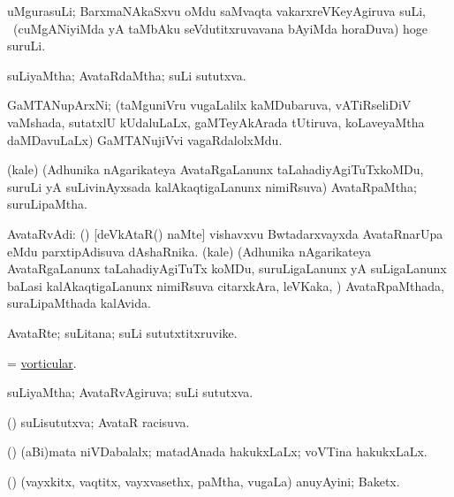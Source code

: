 \bentry
{} 
\gl{\nA}
\expl{}
\bmng
uMgurasuLi; BarxmaNAkaSxvu oMdu saMvaqta vakarxreVKeyAgiruva suLi, \udA\ (cuMgANiyiMda yA taMbAku seVdutitxruvavana bAyiMda horaDuva) hoge suruLi. 
\emng
\eentry

\bentry 
{} 
\gl{\gu}
\expl{}
\bmng
 suLiyaMtha; AvataRdaMtha; suLi sututxva. 
\emng
\eentry

\bentry 
{} 
\gl{\nA}
\expl{}
\bmng
 GaMTANupArxNi; (taMguniVru \mo vugaLalilx kaMDubaruva, vATiRseliDiV vaMshada, sutatxlU kUdaluLaLx, gaMTeyAkArada tUtiruva, koLaveyaMtha daMDavuLaLx) GaMTANujiVvi vagaRdalolxMdu. 
\emng
\eentry

\bentry
{} 
\gl{\nA}
\expl{}
\bmng
 (kale) (Adhunika nAgarikateya AvataRgaLanunx taLahadiyAgiTuTxkoMDu, suruLi yA suLivinAyxsada kalAkaqtigaLanunx nimiRsuva) AvataRpaMtha; suruLipaMtha. 
\emng
\eentry

\bentry 
{} 
\gl{\nA}
\expl{}
\bmng
 AvataRvAdi: 
\banum
{} (\tashA) [deVkAtaR() naMte] vishavxvu Bwtadarxvayxda AvataRnarUpa eMdu parxtipAdisuva dAshaRnika. 
 (kale) (Adhunika nAgarikateya AvataRgaLanunx taLahadiyAgiTuTx koMDu, suruLigaLanunx yA suLigaLanunx baLasi kalAkaqtigaLanunx nimiRsuva citarxkAra, leVKaka, \mo) AvataRpaMthada, suraLipaMthada kalAvida. 
\eanum
\emng
\eentry

\bentry 
{} 
\gl{\nA}
\expl{}
\bmng
 AvataRte; suLitana; suLi sututxtitxruvike. 
\emng
\eentry

\bentry 
{} 
\gl{\gu}
\expl{}
\bmng
 = \hyperlink{vorticular}{vorticular}. 
\emng
\eentry

\bentry 
{} 
\gl{\gu}
\expl{}
\bmng
 suLiyaMtha; AvataRvAgiruva; suLi sututxva. 
\emng
\eentry

\bentry
{} 
\gl{\gu}
\expl{}
\bmng
 (\pArxparx) suLisututxva; AvataR racisuva. 
\emng
\eentry

\bentry 
{} 
\gl{\gu}
\expl{}
\bmng
 (\viparx) (aBi)mata niVDabalalx; matadAnada hakukxLaLx; voVTina hakukxLaLx. 
\emng
\eentry

\bentry
{} 
\gl{\nA}
\expl{}
\bmng
 (\sitxrXV) (vayxkitx, vaqtitx, vayxvasethx, paMtha, \mo vugaLa) anuyAyini; Baketx. 
\emng
\eentry

